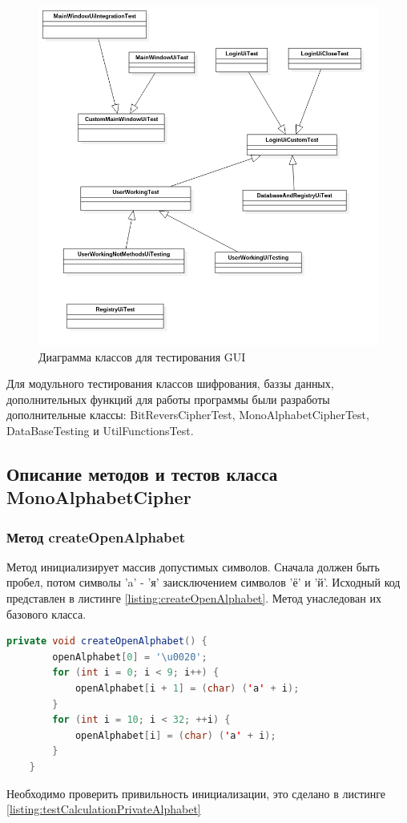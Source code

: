 \documentclass[a4paper,12pt]{article}
\begin{document}
\begin{center}
	\begin{figure}[h!]
		\centering
		\includegraphics[scale=0.6]{img/class_diagram_ui_tests.png}
		\caption{Диаграмма классов для тестирования GUI}
		\label{fig:class_diagram_tests_gui}
	\end{figure}
\end{center}

Для модульного тестирования классов шифрования, баззы данных, дополнительных функций для работы программы были разработы дополнительные классы: BitReversCipherTest, MonoAlphabetCipherTest, DataBaseTesting и UtilFunctionsTest.

\newpage\subsection{Описание методов и тестов класса MonoAlphabetCipher}
\subsubsection{Метод createOpenAlphabet}
Метод инициализирует массив допустимых символов. Сначала должен быть пробел, потом символы 'a' - 'я' заисключением символов 'ё' и 'й'. Исходный код представлен в листинге \ref{listing:createOpenAlphabet}. Метод унаследован их базового класса.
\begin{lstlisting}[language=java, caption=метод createOpenAlphabet, label = listing:createOpenAlphabet]
	private void createOpenAlphabet() {
        openAlphabet[0] = '\u0020';
        for (int i = 0; i < 9; i++) {
            openAlphabet[i + 1] = (char) ('а' + i);
        }
        for (int i = 10; i < 32; ++i) {
            openAlphabet[i] = (char) ('а' + i);
        }
    }
\end{lstlisting}
Необходимо проверить привильность инициализации, это сделано в листинге \ref{listing:testCalculationPrivateAlphabet}
\end{document}
